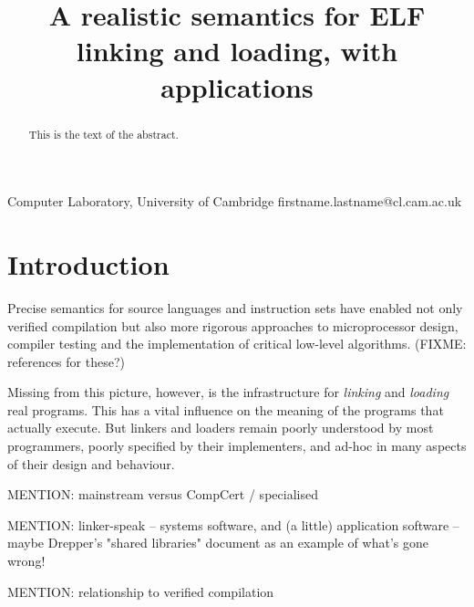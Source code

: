 \documentclass[preprint,natbib,10pt]{sigplanconf}
\begin{document}


\title{A realistic semantics for ELF linking and loading, with applications}

           {Computer Laboratory, University of Cambridge}
           {firstname.lastname@cl.cam.ac.uk}

\maketitle

\begin{abstract}
This is the text of the abstract.
\end{abstract}


% 

\section{Introduction}

Precise semantics for source languages and instruction sets
have enabled not only verified compilation
but also more rigorous approaches to 
microprocessor design, compiler testing
and the implementation of critical low-level algorithms.
(FIXME: references for these?)

Missing from this picture, however, 
is the infrastructure for \emph{linking} and \emph{loading} real programs. 
This has a vital influence on the meaning of the programs 
that actually execute.
But linkers and loaders remain poorly understood by most programmers,
poorly specified by their implementers, 
and ad-hoc in many aspects of their design and behaviour.


MENTION: mainstream versus CompCert / specialised

MENTION: linker-speak -- systems software, and (a little) application software
   -- maybe Drepper's "shared libraries" document as an example of what's gone wrong!

MENTION: relationship to verified compilation
\end{document}
